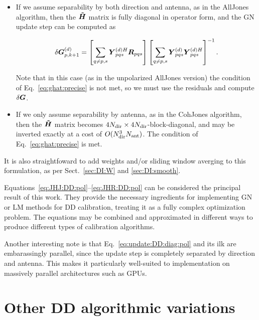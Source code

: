 \documentclass[useAMS,usenatbib]{mn2e}
\newcommand{\mat}[1]{{\bmath{#1}}}
\newcommand{\HHa}{\mat{\tilde{H}}} %
\newcommand{\RR}{\mat{R}}
\newcommand{\GG}{\mat{G}}
\numberwithin{equation}{section} %
\providecommand{\DIFdelbegin}{} %
\providecommand{\DIFdelend}{} %
\begin{document}
\begin{itemize} 
\DIFdelbegin %

\DIFdelend \item If we assume separability by both direction and antenna, as in the {\sc AllJones} algorithm, then
the $\HHa$ matrix is fully diagonal in operator form, and the GN update step can be computed as
\DIFdelbegin %

\DIFdelend \begin{equation}
\label{eq:update:DD:diag:pol}
\delta \GGd_{p,k+1} = 
\left [ \sum\limits_{q\ne p,s} \YYdH_{pqs} \RR_{pqs} \right ]
\left [ \sum\limits_{q\ne p,s} \YYd_{pqs} \YYdH_{pqs}  \right ]^{-1}.
\end{equation}
\DIFdelbegin %

\DIFdelend Note that in this case (as in the unpolarized {\sc AllJones} version) the condition of Eq.~\ref{eq:ghat:precise}
is not met, so we must use the residuals and compute $\delta\GG$.

\item If we only assume separability by antenna, as in the {\sc CohJones} algorithm, then the $\HHa$ matrix 
becomes $4N_\mathrm{dir}\times4N_\mathrm{dir}$-block-diagonal, and may be inverted exactly at a cost of $O(N_\mathrm{dir}^3N_\mathrm{ant})$. The condition 
of Eq.~\ref{eq:ghat:precise} is met.
\end{itemize}

It is also straightfoward to add weights and/or sliding window averging to this formulation, as per 
Sect.~\ref{sec:DI:W} and \ref{sec:DI:smooth}.

Equations~\ref{eq:JHJ:DD:pol}--\ref{eq:JHR:DD:pol} can be considered the principal result of this work.
They provide the necessary ingredients for implementing GN or LM methods for DD calibration, treating it as a 
fully complex optimization problem. The equations may be combined and approximated in different 
ways to produce different types of calibration algorithms. 

Another interesting note is that Eq.~\ref{eq:update:DD:diag:pol} and its ilk are embarassingly parallel, since the update step is 
completely separated by direction and antenna. This makes it particularly well-suited to implementation on massively 
parallel architectures such as GPUs.

\section{Other DD algorithmic variations}
\label{sec:variations}
\end{document}
